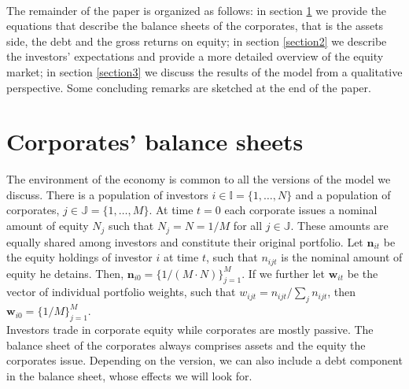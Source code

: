\documentclass[11pt]{article}
\begin{document}
\\
The remainder of the paper is organized as follows: in section \ref{section1} we provide the equations that describe the balance sheets of the corporates, that is the assets side, the debt and the gross returns on equity; in section \ref{section2} we describe the investors' expectations and provide a more detailed overview of the equity market; in section \ref{section3} we discuss the results of the model from a qualitative perspective. Some concluding remarks are sketched at the end of the paper.
%
%
\section{Corporates' balance sheets}\label{section1}
The environment of the economy is common to all the versions of the model we discuss. There is a population of investors $i \in \mathbb{I} = \{ 1,\dots,N\}$ and a population of corporates, $j\in\mathbb{J}=\{1,\dots,M\}$. At time $t=0$ each corporate issues a nominal amount of equity $N_j$ such that $N_j=N=1/M$ for all $j \in \mathbb{J}$. These amounts are equally shared among investors and constitute their original portfolio. Let $\mathbf{n}_{it}$ be the equity holdings of investor $i$ at time $t$, such that $n_{ijt}$ is the nominal amount of equity he detains. Then, $\mathbf{n}_{i0} = \{ 1/(M\cdot N)\}_{j=1}^M$. If we further let $\mathbf{w}_{it}$ be the vector of individual portfolio weights, such that $w_{ijt} = n_{ijt} / \sum_j n_{ijt}$, then $\mathbf{w}_{i0} = \{ 1/M\}_{j=1}^M$.\\
Investors trade in corporate equity  while corporates are mostly passive. The balance sheet of the corporates always comprises assets and the equity the corporates issue. Depending on the version, we can also include a debt component in the balance sheet, whose effects we will look for.
\end{document}
